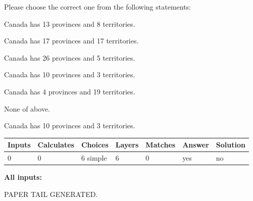 \documentclass[12pt]{article}
\begin{document}
  
Please choose the correct one from the following statements:
 
 
Canada has  13 provinces and  8 territories.
 
 
Canada has  17 provinces and  17 territories.
 
 
Canada has  26 provinces and  5 territories.
 
 
Canada has 10  provinces and 3 territories.
 
 
Canada has   4 provinces and  19 territories.
 
 
 None of above.
 
 
\noindent{}
 
 
Canada has 10  provinces and 3 territories.
 
 
\noindent{}
 
 
   
   
   
   
\noindent\begin{tabular}{|l|l|l|l|l|l|l|}
 \hline
Inputs & Calculates & Choices & Layers & Matches & Answer & Solution \\ \hline
 0  & 
 0  & 
 6
  simple  
  & 
 6  & 
 0  & 
  yes & 
  no 
  \\ \hline
 \end{tabular}
   
   
   
   
\noindent{}
   
   
   
   
\noindent\vspace{0.1in}\hspace{-0.08in} {\textbf{\Large{All inputs: }}}
   
   
   
   
   
   
 \vspace{0.2in}
 
   
   
\vspace{2.0in} PAPER TAIL GENERATED.
   
   
   
\end{document}
